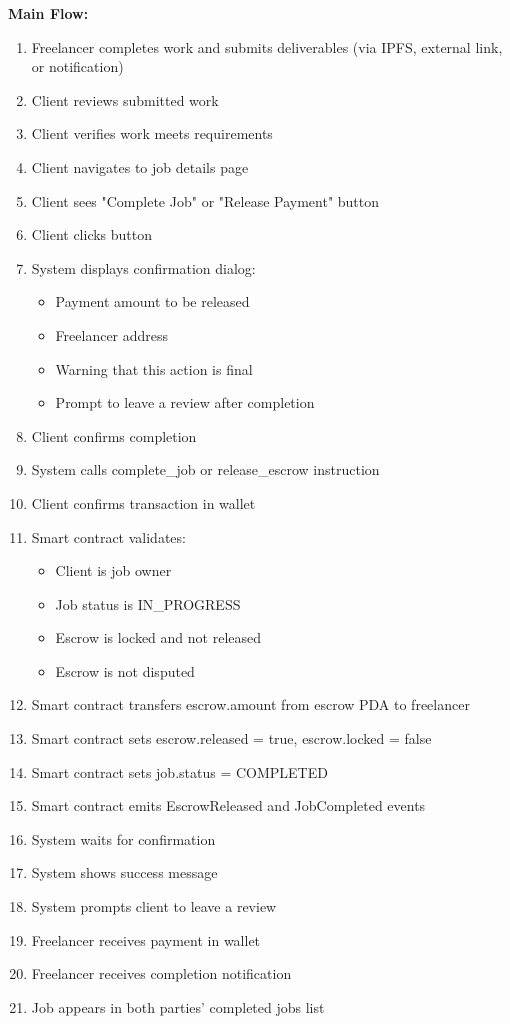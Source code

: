 \documentclass[a4paper,13pt,twoside]{report}
\theoremstyle{definition}
\begin{document}
\textbf{Main Flow:}
\begin{enumerate}
    \item Freelancer completes work and submits deliverables (via IPFS, external link, or notification)
    \item Client reviews submitted work
    \item Client verifies work meets requirements
    \item Client navigates to job details page
    \item Client sees "Complete Job" or "Release Payment" button
    \item Client clicks button
    \item System displays confirmation dialog:
    \begin{itemize}
        \item Payment amount to be released
        \item Freelancer address
        \item Warning that this action is final
        \item Prompt to leave a review after completion
    \end{itemize}
    \item Client confirms completion
    \item System calls complete\_job or release\_escrow instruction
    \item Client confirms transaction in wallet
    \item Smart contract validates:
    \begin{itemize}
        \item Client is job owner
        \item Job status is IN\_PROGRESS
        \item Escrow is locked and not released
        \item Escrow is not disputed
    \end{itemize}
    \item Smart contract transfers escrow.amount from escrow PDA to freelancer
    \item Smart contract sets escrow.released = true, escrow.locked = false
    \item Smart contract sets job.status = COMPLETED
    \item Smart contract emits EscrowReleased and JobCompleted events
    \item System waits for confirmation
    \item System shows success message
    \item System prompts client to leave a review
    \item Freelancer receives payment in wallet
    \item Freelancer receives completion notification
    \item Job appears in both parties' completed jobs list
\end{enumerate}
\end{document}
